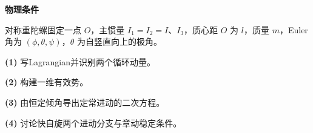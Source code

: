 \textbf{物理条件}\par 对称重陀螺固定一点 \(O\)，主惯量 \(I_1=I_2=I\)、\(I_3\)，质心距 \(O\) 为 \(l\)，质量 \(m\)，Euler角为 \((\phi,\theta,\psi)\)，\(\theta\) 为自竖直向上的极角。
\par\noindent\textbf{(1)} 写Lagrangian并识别两个循环动量。
\par\noindent\textbf{(2)} 构建一维有效势。
\par\noindent\textbf{(3)} 由恒定倾角导出定常进动的二次方程。
\par\noindent\textbf{(4)} 讨论快自旋两个进动分支与章动稳定条件。
